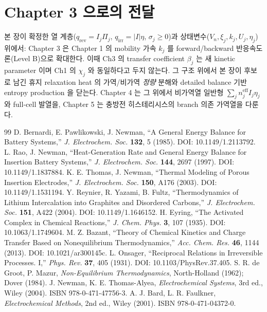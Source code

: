 \documentclass[11pt,a4paper]{article}
\newcommand{\eff}{\mathrm{eff}}
\newcommand{\irr}{\mathrm{irr}}
\newcommand{\rev}{\mathrm{rev}}
\begin{document}
\section*{Chapter 3 으로의 전달}
본 장이 확정한 열 계층($q_\rev=I_j\Pi_j$, $q_\irr=|I|\eta$, $\sigma_j\ge0$)과 상태변수($V_n,\xi_j,k_j,U_j,
\eta_j$) 위에서: Chapter 3 은 Chapter 1 의 mobility 가속 $k_j$ 를 forward/backward 반응속도론(Level B)으로 확대한다.
이때 Ch3 의 transfer coefficient $\beta_j$ 는 새 kinetic parameter 이며 Ch1 의 $\chi_j$ 와 동일하다고 두지 않는다.
그 구조 위에서 본 장이 후보로 남긴 휴지 relaxation heat 의 가역/비가역 \emph{정량} 분해와
detailed balance 기반 entropy production 을 닫는다. Chapter 4 는 그 위에서 비가역열 일반형
$\sum_j n_j^{\eff}I_j\eta_j$ 와 full-cell 발열을, Chapter 5 는 충방전 히스테리시스의 branch 의존 가역열을 다룬다.

\begin{thebibliography}{99}
 D. Bernardi, E. Pawlikowski, J. Newman, ``A General Energy Balance for Battery
  Systems,'' \emph{J. Electrochem. Soc.} \textbf{132}, 5 (1985). DOI: 10.1149/1.2113792.
 L. Rao, J. Newman, ``Heat-Generation Rate and General Energy Balance for Insertion
  Battery Systems,'' \emph{J. Electrochem. Soc.} \textbf{144}, 2697 (1997). DOI: 10.1149/1.1837884.
 K. E. Thomas, J. Newman, ``Thermal Modeling of Porous Insertion Electrodes,''
  \emph{J. Electrochem. Soc.} \textbf{150}, A176 (2003). DOI: 10.1149/1.1531194.
 Y. Reynier, R. Yazami, B. Fultz, ``Thermodynamics of Lithium Intercalation into
  Graphites and Disordered Carbons,'' \emph{J. Electrochem. Soc.} \textbf{151}, A422 (2004).
  DOI: 10.1149/1.1646152.
 H. Eyring, ``The Activated Complex in Chemical Reactions,'' \emph{J. Chem. Phys.}
  \textbf{3}, 107 (1935). DOI: 10.1063/1.1749604.
 M. Z. Bazant, ``Theory of Chemical Kinetics and Charge Transfer Based on
  Nonequilibrium Thermodynamics,'' \emph{Acc. Chem. Res.} \textbf{46}, 1144 (2013).
  DOI: 10.1021/ar300145c.
 L. Onsager, ``Reciprocal Relations in Irreversible Processes. I,'' \emph{Phys. Rev.}
  \textbf{37}, 405 (1931). DOI: 10.1103/PhysRev.37.405.
 S. R. de Groot, P. Mazur, \emph{Non-Equilibrium Thermodynamics},
  North-Holland (1962); Dover (1984).
 J. Newman, K. E. Thomas-Alyea, \emph{Electrochemical Systems}, 3rd ed., Wiley (2004).
  ISBN 978-0-471-47756-3.
 A. J. Bard, L. R. Faulkner, \emph{Electrochemical Methods}, 2nd ed., Wiley (2001).
  ISBN 978-0-471-04372-0.
\end{thebibliography}
\end{document}
